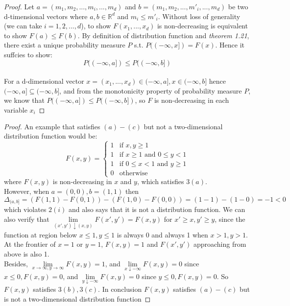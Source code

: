 \documentclass[10pt]{article}
\newenvironment{problem}[2][Problem]{\begin{trivlist}
\item[\hskip \labelsep {\bfseries #1}\hskip \labelsep {\bfseries #2.}]}{\end{trivlist}}
\begin{document}
\begin{problem}{2}
\end{problem}
 
\begin{proof}
Let $a = (m_{1}, m_{2}, ..., m_{i}, ..., m_{d})$ and $b = (m_{1}, m_{2}, ..., m'_{i}, ..., m_{d})$ be two d-timensional vectors where $a, b \in \mathbb{R}^d$ and $m_{i} \le m'_{i}$.
Without loss of generality (we can take $i = 1,2,...,d$), to show $F(x_{1},..., x_{d})$ is non-decreasing is equivalent to show $F(a) \le F(b)$.
By definition of distribution function and \textit{theorem 1.21}, there exist a unique probability measure $P$ s.t. $P((-\infty, x]) = F(x)$. Hence it suffcies to show: $$P((-\infty, a]) \le P((-\infty, b])$$\\
For a d-dimensional vector $x = (x_{1},..., x_{d}) \in (-\infty, a], x \in (-\infty, b]$ hence $(-\infty, a] \subseteq (-\infty, b]$, and from the monotonicity property of probability measure $P$, we know that $P((-\infty, a]) \le P((-\infty, b])$, so $F$ is non-decreasing in each variable $x_{i}$
\end{proof}



\begin{problem}{3}
\end{problem}
\begin{proof}
An example that satisfies $(a)-(c)$ but not a two-dimensional distribution function would be:\\
\[
  F(x,y) =
  \begin{cases}
  1 & \text{if $x,y\ge1$} \\
  1 & \text{if $x\ge1$ and $0 \le y <1$} \\
  1 & \text{if $0 \le x <1$ and $y\ge1$} \\
  0 & \text{otherwise}
  \end{cases}
\]
where $F(x,y)$ is non-decreasing in $x$ and $y$, which satisfies $3(a)$.\\
However, when $a = (0,0), b = (1,1)$ then $$\Delta_{(a,b]} = (F(1,1) - F(0,1)) - (F(1,0) - F(0,0)) = (1-1) - (1-0)  = -1 < 0$$ which violates $2(i)$ and also says that it is not a distribution function.
We can also verify that $\lim\limits_{(x',y') \downarrow (x,y)} F(x',y') = F(x,y)$ for $x' \ge x, y' \ge y$, since the function at region below $x\le1, y\le1$ is always 0 and always 1 when $x>1, y>1$. At the frontier of $x=1$ or $y=1$, $F(x,y)=1$ and $F(x',y
')$ approaching from above is also 1.\\
Besides, $\lim\limits_{x \rightarrow \infty, y \rightarrow \infty} F(x,y) = 1$, and $\lim\limits_{x \downarrow -\infty} F(x,y) = 0$ since $x\le 0, F(x,y)=0$, and $\lim\limits_{y \downarrow -\infty} F(x,y) = 0$ since $y\le 0, F(x,y)=0$. So $F(x,y)$ satisfies $3(b),3(c)$.
In conclusion $F(x,y)$ satisfies $(a)-(c)$ but is not a two-dimensional distribution function
\end{proof}
\end{document}

